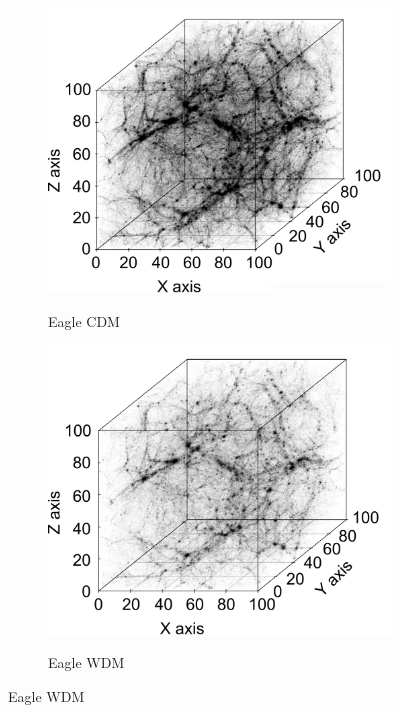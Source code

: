 \documentclass[12pt]{article}
\begin{document}
\begin{figure}[htp!]
  \centering
  \label{fig:eagleDiags}
  \begin{subfigure}{0.24\textwidth}
        \caption{Eagle CDM}
  \includegraphics[width=\linewidth]{wdmfig.pdf}
    \label{fig:eagleDiagsA}
  \end{subfigure}
    \begin{subfigure}{0.24\textwidth}
        \caption{Eagle WDM}
  \includegraphics[width=\linewidth]{cdmfig.pdf}
    \label{fig:eagleDiagsB}
  \end{subfigure}

\end{figure}
\end{document}
